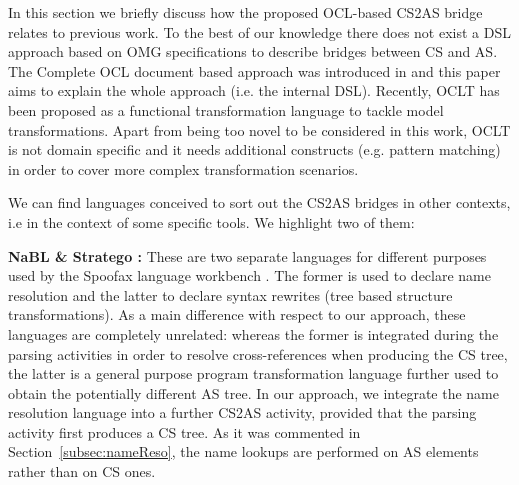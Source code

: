 \documentclass{llncs}
\begin{document}
In this section we briefly discuss how the proposed OCL-based CS2AS bridge relates to previous work. To the best of our knowledge there does not exist a DSL approach based on OMG specifications to describe bridges between CS and AS. The Complete OCL document based approach was introduced in \cite{sanchez2014enhancingXtext} and this paper aims to explain the whole approach (i.e. the internal DSL). Recently,  OCLT \cite{jouault2015oclt} has been proposed as a functional transformation language to tackle model transformations. Apart from being too novel to be considered in this work, OCLT is not domain specific and it needs additional constructs (e.g. pattern matching) in order to cover more complex transformation scenarios.

We can find languages conceived to sort out the CS2AS bridges in other contexts, i.e in the context of some specific tools. %
We highlight two of them:

\textbf{NaBL \cite{konat2013decNameRes} \& Stratego \cite{visser2004stratego}:} These are two separate languages for different purposes used by the Spoofax language workbench \cite{spoofaxOnline}. The former is used to declare name resolution and the latter to declare syntax rewrites (tree based structure transformations). As a main difference with respect to our approach, these languages are completely unrelated: whereas the former is integrated during the parsing activities in order to resolve cross-references when producing the CS tree, the latter is a general purpose program transformation language further used to obtain the potentially different AS tree. In our approach, we integrate the name resolution language into a further CS2AS activity, provided that the parsing activity first produces a CS tree. As it was commented in Section~\ref{subsec:nameReso}, the name lookups are performed on AS elements rather than on CS ones.
\end{document}
